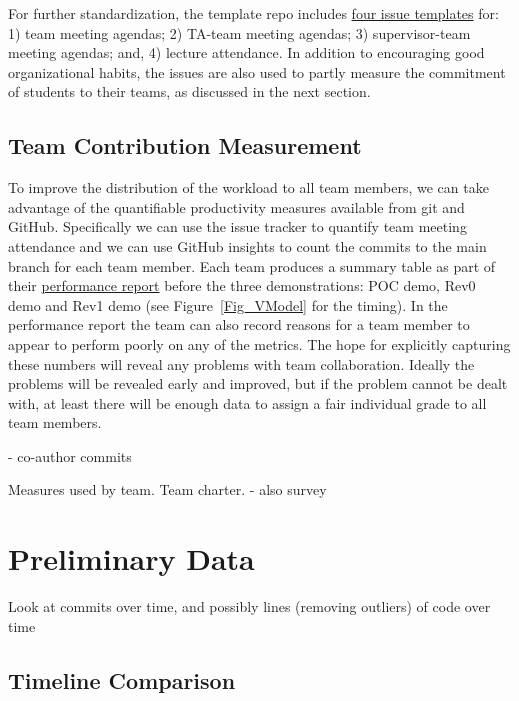 \documentclass[10pt, conference]{IEEEtran}
\begin{document}
For further standardization, the template repo includes
\href{Redact link}
{four issue templates} for: 1) team meeting agendas; 2) TA-team meeting agendas;
3) supervisor-team meeting agendas; and, 4) lecture attendance.  In addition to
encouraging good organizational habits, the issues are also used to partly
measure the commitment of students to their teams, as discussed in the next
section.

\subsection{Team Contribution Measurement} \label{Sec_TeamContribMeasure}

To improve the distribution of the workload to all team members, we can take
advantage of the quantifiable productivity measures available from git and
GitHub.  Specifically we can use the issue tracker to quantify team meeting
attendance and we can use GitHub insights to count the commits to the main
branch for each team member.  Each team produces a summary table as part of
their \href{REDACT LINK}  
{performance report} before the three demonstrations: POC demo, Rev0 demo and
Rev1 demo (see Figure~\ref{Fig_VModel} for the timing). In the performance
report the team can also record reasons for a team member to appear to perform
poorly on any of the metrics. The hope for explicitly capturing these numbers
will reveal any problems with team collaboration.  Ideally the problems will be
revealed early and improved, but if the problem cannot be dealt with, at least
there will be enough data to assign a fair individual grade to all team members.

- co-author commits

Measures used by team.  Team charter. 
- also survey

\section{Preliminary Data} \label{SecPrelimData}

Look at commits over time, and possibly lines (removing outliers) of code over
time


\subsection{Timeline Comparison}
\end{document}
